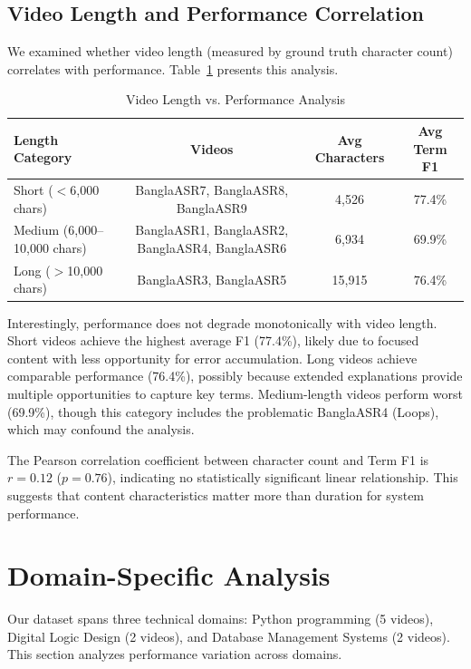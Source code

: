 \subsection{Video Length and Performance Correlation}

We examined whether video length (measured by ground truth character count) correlates with performance. Table~\ref{tab:length_correlation} presents this analysis.

\begin{table}[h]
\centering
\caption{Video Length vs. Performance Analysis}
\label{tab:length_correlation}
\begin{tabular}{|l|c|c|c|}
\hline
\textbf{Length Category} & \textbf{Videos} & \textbf{Avg Characters} & \textbf{Avg Term F1} \\
\hline
Short ($<$6,000 chars) & BanglaASR7, BanglaASR8, BanglaASR9 & 4,526 & 77.4\% \\
\hline
Medium (6,000--10,000 chars) & BanglaASR1, BanglaASR2, BanglaASR4, BanglaASR6 & 6,934 & 69.9\% \\
\hline
Long ($>$10,000 chars) & BanglaASR3, BanglaASR5 & 15,915 & 76.4\% \\
\hline
\end{tabular}
\end{table}

Interestingly, performance does not degrade monotonically with video length. Short videos achieve the highest average F1 (77.4\%), likely due to focused content with less opportunity for error accumulation. Long videos achieve comparable performance (76.4\%), possibly because extended explanations provide multiple opportunities to capture key terms. Medium-length videos perform worst (69.9\%), though this category includes the problematic BanglaASR4 (Loops), which may confound the analysis.

The Pearson correlation coefficient between character count and Term F1 is $r = 0.12$ ($p = 0.76$), indicating no statistically significant linear relationship. This suggests that content characteristics matter more than duration for system performance.

\section{Domain-Specific Analysis}

Our dataset spans three technical domains: Python programming (5 videos), Digital Logic Design (2 videos), and Database Management Systems (2 videos). This section analyzes performance variation across domains.

